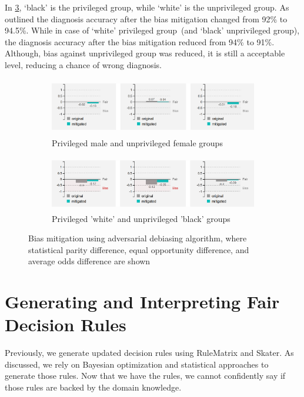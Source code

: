 \hspace*{3.5mm} In \cref{fig:debiases_2}, `black' is the privileged group, while `white' is the unprivileged group. As outlined the diagnosis accuracy after the bias mitigation changed from 92\% to 94.5\%. While in case of `white' privileged group~(and `black' unprivileged group), the diagnosis accuracy after the bias mitigation reduced from 94\% to 91\%. Although, bias against unprivileged group was reduced, it is still a acceptable level, reducing a chance of wrong diagnosis.  

\begin{figure}[h]
	\centering
	\begin{subfigure}{.48\linewidth}
		\centering
		\includegraphics[width=\linewidth,height=25mm]{images/debias_3.png}
		\caption{Privileged male and unprivileged female groups}
		 \label{fig:debias_3}
	\end{subfigure}
	\begin{subfigure}{0.48\linewidth}
		\centering
		\includegraphics[width=\linewidth,height=24mm]{images/debias_4.png}
		\caption{Privileged 'white' and unprivileged 'black' groups}
        \label{fig:debias_4}
	\end{subfigure}
	\caption{Bias mitigation using adversarial debiasing algorithm, where statistical parity difference, equal opportunity difference, and average odds difference are shown}
	\label{fig:debiases_2}
	\vspace{-2mm}
\end{figure}
\fi 

\section{Generating and Interpreting Fair Decision Rules}
\label{sec:rule_gen_inter}
Previously, we generate updated decision rules using RuleMatrix and Skater. As discussed, we rely on Bayesian optimization and statistical approaches to generate those rules. Now that we have the rules, we cannot confidently say if those rules are backed by the domain knowledge. 


